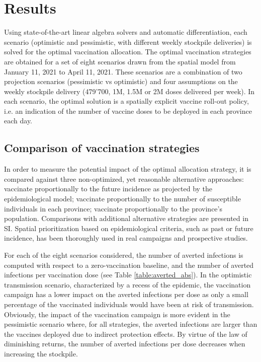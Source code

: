 \section{Results}
Using state-of-the-art linear algebra solvers and automatic differentiation, each scenario (optimistic and pessimistic, with different weekly stockpile deliveries) is solved for the optimal vaccination allocation. The optimal vaccination strategies are obtained for a set of eight scenarios drawn from the spatial model from January 11, 2021 to April 11, 2021. These scenarios are a combination of two projection scenarios (pessimistic vs optimistic) and four assumptions on the weekly stockpile delivery (479'700, 1M, 1.5M or 2M doses delivered per week). In each scenario, the optimal solution is a spatially explicit vaccine roll-out policy, i.e. an indication of the number of vaccine doses to be deployed in each province each day. 
\subsection*{Comparison of vaccination strategies}
In order to measure the potential impact of the optimal allocation strategy, it is compared against three non-optimized, yet reasonable alternative approaches: vaccinate proportionally to the future incidence as projected by the epidemiological model; vaccinate proportionally to the number of susceptible individuals in each province; vaccinate proportionally to the province's population. 
Comparisons with additional alternative strategies are presented in SI. Spatial prioritization based on epidemiological criteria, such as past\cite{Lee:AchievingCoordinatedNational:2020} or future\cite{Pasetto:RealtimeForecastingCholera:2018} incidence, has been thoroughly used in real campaigns and prospective studies.

For each of the eight scenarios considered, the number of averted infections is computed with respect to a zero-vaccination baseline, and the number of averted infections per vaccination dose (see Table \ref{table:averted_abs}). In the optimistic transmission scenario, characterized by a recess of the epidemic, the vaccination campaign has a lower impact on the averted infections per dose as only a small percentage of the vaccinated individuals would have been at risk of transmission. Obviously, the impact of the vaccination campaign is more evident in the pessimistic scenario where, for all strategies, the averted infections are larger than the vaccines deployed due to indirect protection effects. By virtue of the law of diminishing returns, the number of averted infections per dose decreases when increasing the stockpile. 

